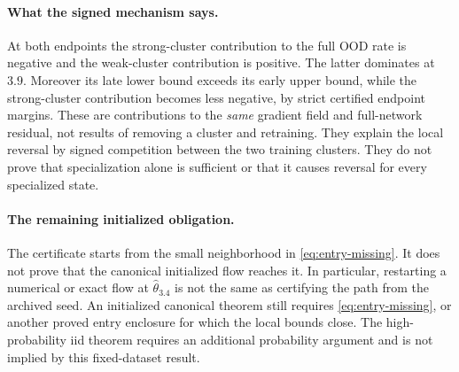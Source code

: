 \documentclass[10pt]{article}
\begin{document}
\paragraph{What the signed mechanism says.}
At both endpoints the strong-cluster contribution to the full OOD rate is
negative and the weak-cluster contribution is positive. The latter dominates
at $3.9$. Moreover its late lower bound exceeds its early upper bound, while
the strong-cluster contribution becomes less negative, by strict certified
endpoint margins. These are contributions to the \emph{same} gradient field
and full-network residual, not results of removing a cluster and retraining.
They explain the local reversal by signed competition between the two
training clusters. They do not prove that specialization alone is sufficient
or that it causes reversal for every specialized state.

\paragraph{The remaining initialized obligation.}
The certificate starts from the small neighborhood in
\eqref{eq:entry-missing}. It does not prove that the canonical initialized
flow reaches it. In particular, restarting a numerical or exact flow at
$\widehat\theta_{3.4}$ is not the same as certifying the path from the
archived seed. An initialized canonical theorem still requires
\eqref{eq:entry-missing}, or another proved entry enclosure for which the
local bounds close. The high-probability iid theorem requires an additional
probability argument and is not implied by this fixed-dataset result.
\end{document}
